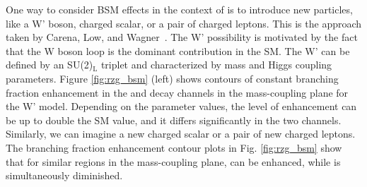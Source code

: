 One way to consider BSM effects in the context of \hzg{} is to introduce new particles, like a W' boson, charged scalar, or a pair of charged leptons. 
This is the approach taken by Carena, Low, and Wagner~\cite{Zg_theory_decaywidth}. The W' possibility is motivated by the fact that the W boson loop is the dominant 
contribution in the SM. The W' can be defined by an SU(2)$_{\mathrm{L}}$ triplet and characterized by mass and Higgs coupling parameters. Figure \ref{fig:rzg_bsm} (left) shows contours of constant branching fraction 
enhancement in the \hzg{} and \hgg{} decay channels in the mass-coupling plane for the W' model. 
Depending on the parameter values, the level of enhancement can be up to double the SM value, and it differs 
significantly in the two channels. Similarly, we can imagine a new charged scalar or a pair of new charged leptons. The branching fraction enhancement contour plots in Fig. \ref{fig:rzg_bsm} show that for similar regions in the mass-coupling plane, \hzg{} can be enhanced, while \hgg{} is simultaneously diminished. 

